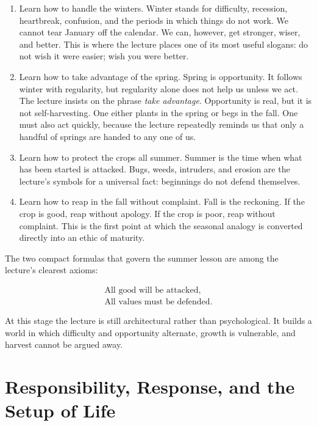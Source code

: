 \begin{enumerate}
\item Learn how to handle the winters. Winter stands for difficulty, recession, heartbreak, confusion, and the periods in which things do not work. We cannot tear January off the calendar. We can, however, get stronger, wiser, and better. This is where the lecture places one of its most useful slogans: do not wish it were easier; wish you were better.

\item Learn how to take advantage of the spring. Spring is opportunity. It follows winter with regularity, but regularity alone does not help us unless we act. The lecture insists on the phrase \emph{take advantage}. Opportunity is real, but it is not self-harvesting. One either plants in the spring or begs in the fall. One must also act quickly, because the lecture repeatedly reminds us that only a handful of springs are handed to any one of us.

\item Learn how to protect the crops all summer. Summer is the time when what has been started is attacked. Bugs, weeds, intruders, and erosion are the lecture's symbols for a universal fact: beginnings do not defend themselves.

\item Learn how to reap in the fall without complaint. Fall is the reckoning. If the crop is good, reap without apology. If the crop is poor, reap without complaint. This is the first point at which the seasonal analogy is converted directly into an ethic of maturity.
\end{enumerate}

The two compact formulas that govern the summer lesson are among the lecture's clearest axioms:

\begin{align}
\text{All good will be attacked},\\
\text{All values must be defended}.
\end{align}

At this stage the lecture is still architectural rather than psychological. It builds a world in which difficulty and opportunity alternate, growth is vulnerable, and harvest cannot be argued away.

\section{Responsibility, Response, and the Setup of Life}


